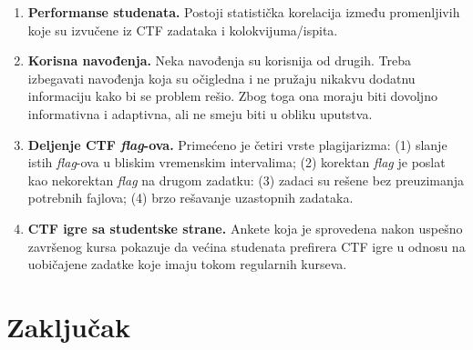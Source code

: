 \documentclass[12pt, a4paper, twocolumn]{article}
\begin{document}
\begin{enumerate}
    \item \textbf{Performanse studenata.} Postoji statistička korelacija 
        između promenljivih koje su izvučene iz CTF zadataka i 
        kolokvijuma/ispita. 
    \item \textbf{Korisna navođenja.} Neka navođenja su korisnija od
        drugih. Treba izbegavati navođenja koja su očigledna i ne pružaju
        nikakvu dodatnu informaciju kako bi se problem rešio. Zbog toga ona
        moraju biti dovoljno informativna i adaptivna, ali ne smeju biti u 
        obliku uputstva.
    \item \textbf{Deljenje CTF \emph{flag}-ova.} Primećeno je četiri vrste
        plagijarizma: (1) slanje istih \emph{flag}-ova u bliskim vremenskim
        intervalima; (2) korektan \emph{flag} je poslat kao nekorektan
        \emph{flag} na drugom zadatku: (3) zadaci su rešene bez preuzimanja
        potrebnih fajlova; (4) brzo rešavanje uzastopnih zadataka.
    \item \textbf{CTF igre sa studentske strane.} Ankete koja je sprovedena 
        nakon uspešno završenog kursa pokazuje da većina studenata prefirera
        CTF igre u odnosu na uobičajene zadatke koje imaju tokom regularnih
        kurseva.
\end{enumerate}

\section{Zaključak}

\nocite{*}

\printbibliography
\end{document}
